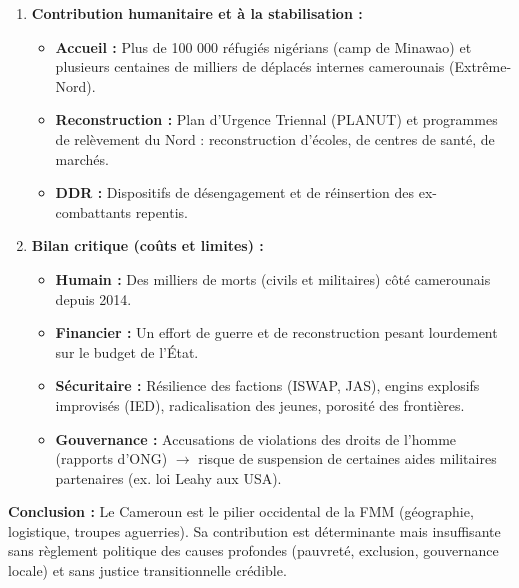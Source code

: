 \documentclass[11pt]{article}
\newcommand{\cle}[1]{{\popxbold\color{popdark}#1}}
\begin{document}
\begin{exoresolu}
\begin{enumerate}
\begin{itemize}
            \end{itemize}
        \item \textbf{Contribution humanitaire et à la stabilisation :}
            \begin{itemize}
                \item \textbf{Accueil :} Plus de 100 000 réfugiés nigérians (camp de Minawao) et plusieurs centaines de milliers de déplacés internes camerounais (Extrême-Nord).
                \item \textbf{Reconstruction :} \cle{Plan d'Urgence Triennal (PLANUT)} et programmes de relèvement du Nord : reconstruction d'écoles, de centres de santé, de marchés.
                \item \textbf{DDR :} Dispositifs de désengagement et de réinsertion des ex-combattants repentis.
            \end{itemize}
        \item \textbf{Bilan critique (coûts et limites) :}
            \begin{itemize}
                \item \textbf{Humain :} Des milliers de morts (civils et militaires) côté camerounais depuis 2014.
                \item \textbf{Financier :} Un effort de guerre et de reconstruction pesant lourdement sur le budget de l'État.
                \item \textbf{Sécuritaire :} Résilience des factions (ISWAP, JAS), engins explosifs improvisés (IED), radicalisation des jeunes, porosité des frontières.
                \item \textbf{Gouvernance :} Accusations de violations des droits de l'homme (rapports d'ONG) $\rightarrow$ risque de suspension de certaines aides militaires partenaires (ex. loi Leahy aux USA).
            \end{itemize}
    \end{enumerate}
    \textbf{Conclusion :} Le Cameroun est le \cle{pilier occidental} de la FMM (géographie, logistique, troupes aguerries). Sa contribution est \cle{déterminante mais insuffisante} sans règlement politique des causes profondes (pauvreté, exclusion, gouvernance locale) et sans justice transitionnelle crédible.
\end{exoresolu}
\end{document}
